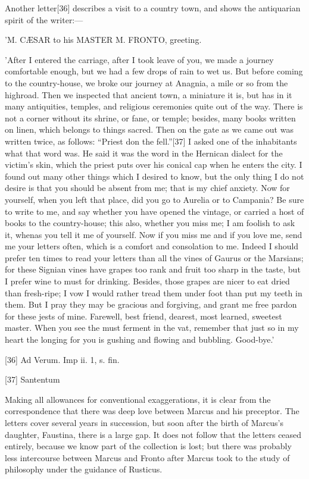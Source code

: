 Another letter[36]
describes a visit to a country town, and shows the antiquarian spirit of
the writer:—

'M. CÆSAR to his MASTER M. FRONTO, greeting.

'After I entered the carriage, after I took leave of you, we made a
journey comfortable enough, but we had a few drops of rain to wet us. But
before coming to the country-house, we broke our journey at Anagnia, a
mile or so from the highroad. Then we inspected that ancient town, a
miniature it is, but has in it many antiquities, temples, and religious
ceremonies quite out of the way. There is not a corner without its shrine,
or fane, or temple; besides, many books written on linen, which belongs to
things sacred. Then on the gate as we came out was written twice, as
follows: ``Priest don the fell.''[37]
I asked one of the inhabitants what that word was. He said it was the
word in the Hernican dialect for the victim's skin, which the priest puts
over his conical cap when he enters the city. I found out many other
things which I desired to know, but the only thing I do not desire is
that you should be absent from me; that is my chief anxiety. Now for
yourself, when you left that place, did you go to Aurelia or to Campania?
Be sure to write to me, and say whether you have opened the vintage, or
carried a host of books to the country-house; this also, whether you miss
me; I am foolish to ask it, whenas you tell it me of yourself. Now if you
miss me and if you love me, send me your letters often, which is a
comfort and consolation to me. Indeed I should prefer ten times to read
your letters than all the vines of Gaurus or the Marsians; for these
Signian vines have grapes too rank and fruit too sharp in the taste, but
I prefer wine to must for drinking. Besides, those grapes are nicer to
eat dried than fresh-ripe; I vow I would rather tread them under foot
than put my teeth in them. But I pray they may be gracious and forgiving,
and grant me free pardon for these jests of mine. Farewell, best friend,
dearest, most learned, sweetest master. When you see the must ferment in
the vat, remember that just so in my heart the longing for you is gushing
and flowing and bubbling. Good-bye.'

[36]
Ad Verum. Imp ii. 1, s. fin.

[37]
Santentum

Making all allowances for conventional exaggerations, it is clear from the
correspondence that there was deep love between Marcus and his preceptor.
The letters cover several years in succession, but soon after the birth of
Marcus's daughter, Faustina, there is a large gap. It does not follow that
the letters ceased entirely, because we know part of the collection is
lost; but there was probably less intercourse between Marcus and Fronto
after Marcus took to the study of philosophy under the guidance of
Rusticus.

